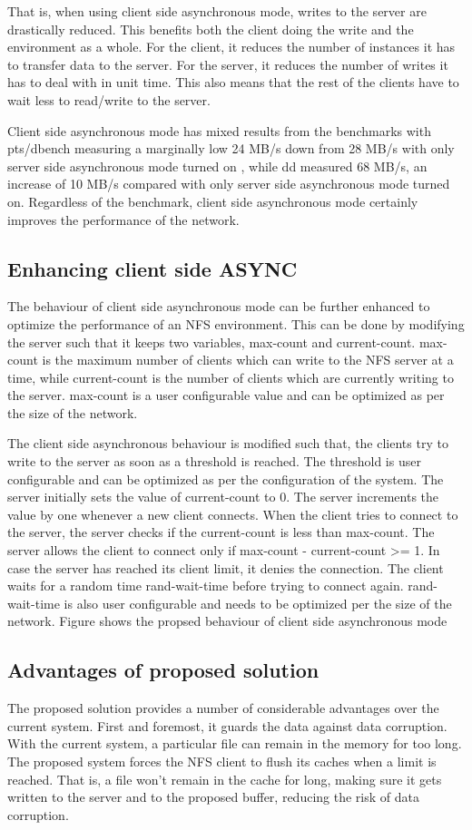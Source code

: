 \documentclass[conference]{IEEEtran}
\begin{document}
That is, when using client side asynchronous mode, writes to the server are
drastically reduced. This benefits both the client doing the write and the
environment as a whole. For the client, it reduces the number of instances
it has to transfer data to the server. For the server, it reduces the
number of writes it has to deal with in unit time. This also means that the
rest of the clients have to wait less to read/write to the server.

Client side asynchronous mode has mixed results from the benchmarks with
pts/dbench measuring a marginally low 24 MB/s down from 28 MB/s with only 
server side asynchronous mode turned on , while dd measured 68 MB/s, an 
increase of 10 MB/s compared with only server side asynchronous mode turned
on. Regardless of the benchmark, client side asynchronous mode certainly
improves the performance of the network.

\subsection{Enhancing client side ASYNC }\label{SCM}
The behaviour of client side asynchronous mode can be further enhanced to 
optimize the performance of an NFS environment. This can be done by
modifying the server such that it keeps two variables, max-count and 
current-count. max-count is the maximum number of clients which can write 
to the NFS server at a time, while current-count is the number of clients 
which are currently writing to the server. max-count is a user configurable
value and can be optimized as per the size of the network.

The client side asynchronous behaviour is modified such that, the clients 
try to write to the server as soon as a threshold is reached. The threshold
is user configurable and can be optimized as per the configuration of the
system. The server initially sets the value of current-count to 0. The 
server increments the value by one whenever a new client connects. When the
client tries to connect to the server, the server checks if the
current-count is less than max-count. The server allows the client to
connect only if max-count - current-count >= 1. In case the server has
reached its client limit, it denies the connection. The client waits for a
random time rand-wait-time before trying to connect again. rand-wait-time
is also user configurable and needs to be optimized per the size of the
network.
Figure shows the propsed behaviour of client side asynchronous mode
\subsection{Advantages of proposed solution}
The proposed solution provides a number of considerable advantages over the
current system. First and foremost, it guards the data against data 
corruption. With the current system, a particular file can remain in the
memory for too long. The proposed system forces the NFS client to flush its
caches when a limit is reached. That is, a file won't remain in the cache
for long, making sure it gets written to the server and to the proposed
buffer, reducing the risk of data corruption.
\end{document}
